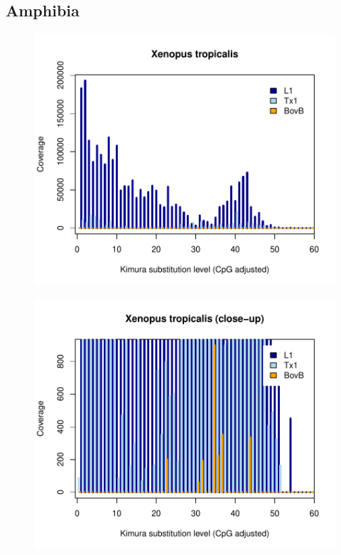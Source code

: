 \documentclass[12pt,a4paper,times]{article}
\begin{document}
\subsection*{Amphibia}

\begin{figure}[H]
	\centering
	\includegraphics[scale=0.8]{suppFigures/divergencePlots/Xenopus_tropicalis.pdf}
	\caption{\label{Xenopus_tropicalis}}
\end{figure}

\begin{figure}[H]
	\centering
	\includegraphics[scale=0.8]{suppFigures/divergencePlots/Xenopus_tropicalis_closeup.pdf}
	\caption{\label{Xenopus_tropicalis_closeup}}
\end{figure}
\end{document}

